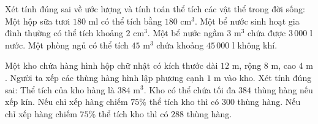 \begin{ex} %
Xét tính đúng sai về ước lượng và tính toán thể tích các vật thể trong đời sống:
\choiceTF
{\True Một hộp sữa tươi $180\text{ ml}$ có thể tích bằng $180\text{ cm}^3$.}
{Một bể nước sinh hoạt gia đình thường có thể tích khoảng $2\text{ cm}^3$.}
{\True Một bể nước ngầm $3\text{ m}^3$ chứa được $3\,000\text{ l}$ nước.}
{\True Một phòng ngủ có thể tích $45\text{ m}^3$ chứa khoảng $45\,000\text{ l}$ không khí.}
\end{ex}

\begin{ex} %
Một kho chứa hàng hình hộp chữ nhật có kích thước dài $12\text{ m}$, rộng $8\text{ m}$, cao $4\text{ m}$. Người ta xếp các thùng hàng hình lập phương cạnh $1\text{ m}$ vào kho. Xét tính đúng sai:
\choiceTF
{\True Thể tích của kho hàng là $384\text{ m}^3$.}
{\True Kho có thể chứa tối đa $384$ thùng hàng nếu xếp kín.}
{Nếu chỉ xếp hàng chiếm $75\%$ thể tích kho thì có $300$ thùng hàng.}
{\True Nếu chỉ xếp hàng chiếm $75\%$ thể tích kho thì có $288$ thùng hàng.}
\end{ex}

